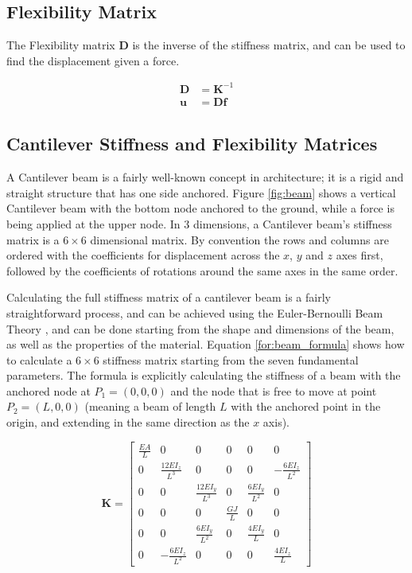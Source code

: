 \subsection{Flexibility Matrix}
\label{sec:flex_matrix}

The Flexibility matrix $\mathbf{D}$ is the inverse of the stiffness matrix,
and can be used to find the displacement given a force.

\begin{equation}
\begin{split}
    \mathbf{D} &= \mathbf{K}^{-1} \\
    \mathbf{u} &= \mathbf{D} \mathbf{f}
\end{split}
\label{for:flexibility}
\end{equation}



\subsection{Cantilever Stiffness and Flexibility Matrices}
\label{sec:cantilever_matrixes}

A Cantilever beam is a fairly well-known concept in architecture; it is a rigid and straight structure
that has one side anchored. Figure \ref{fig:beam} shows a vertical Cantilever beam with the
bottom node anchored to the ground, while a force is being applied at the upper node.
In 3 dimensions, a Cantilever beam's stiffness matrix is a $6 \times 6$ dimensional matrix.
By convention the rows and columns are ordered with the coefficients for displacement across
the $x$, $y$ and $z$ axes first, followed by the coefficients of rotations around the same axes in the
same order.

Calculating the full stiffness matrix of a cantilever beam is a fairly straightforward process,
and can be achieved using the Euler-Bernoulli Beam Theory \cite{beam_theory},
and can be done starting from the shape and dimensions of the beam, as well as the properties of the
material.
Equation \ref{for:beam_formula} shows how to calculate a $6 \times 6$ stiffness matrix starting
from the seven fundamental parameters. The formula is explicitly calculating the
stiffness of a beam with the anchored node at $P_1=(0, 0, 0)$ and the node
that is free to move at point $P_2 = (L, 0, 0)$ (meaning a beam of length $L$ with
the anchored point in the origin, and extending in the same direction as the $x$ axis).


\begin{equation}
\mathbf{K} =
\begin{bmatrix}
\frac{EA}{L} & 0 & 0 & 0 & 0 & 0 \\
0 & \frac{12EI_z}{L^3} & 0 & 0 & 0 & -\frac{6EI_z}{L^2} \\
0 & 0 & \frac{12EI_y}{L^3} & 0 & \frac{6EI_y}{L^2} & 0 \\
0 & 0 & 0 & \frac{GJ}{L} & 0 & 0 \\
0 & 0 & \frac{6EI_y}{L^2} & 0 & \frac{4EI_y}{L} & 0 \\
0 & -\frac{6EI_z}{L^2} & 0 & 0 & 0 & \frac{4EI_z}{L}
\end{bmatrix}
\label{for:beam_formula}
\end{equation}

